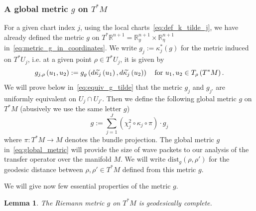 \documentclass[10pt]{amsart}
\newtheorem{lemm}[theo]{Lemma}\newtheorem{prop}[theo]{Proposition}\newtheorem{coro}[theo]{Corollary}\newtheorem{conj}[theo]{Conjecture}
\theoremstyle{definition}\newtheorem{defi}[theo]{Definition}\newtheorem{rema}[theo]{Remark}\newtheorem{exam}[theo]{Example}\newtheorem{exem}[theo]{Example}\newtheorem{nota}[theo]{Notation}
\newcommand{\dist}{\mathrm{dist}}
\newcommand{\bbR}{\mathbb{R}}
\let\oldtilde\tilde
\renewcommand*{\tilde}[1]{\mathchoice{\widetilde{#1}}{\widetilde{#1}}{\oldtilde{#1}}{\oldtilde{#1}}}
\begin{document}
\subsubsection{\label{subsec:A-metric}
A global metric \texorpdfstring{$g$}{g} on \texorpdfstring{$T^{*}M$}{T*M}}

For a given chart index $j$, using the local charts~\eqref{eq:def_k_tilde_j}, we have already defined the metric $g$ on $T^{*}\bbR^{n+1}=\bbR_{y}^{n+1}\times\bbR_{\eta}^{n+1}$ in~\eqref{eq:metric_g_in_coordinates}. We write $g_{j}:=\kappa_{j}^{*}(g)$ for the metric induced on $T^{*}U_{j}$, i.e. at a given point $\rho\in T^{*}U_{j}$, it is given by
\[
g_{j,\rho}\left(u_{1},u_{2}\right):=g_{\varrho}\left(d\tilde{\kappa_{j}}\left(u_{1}\right),d\tilde{\kappa_{j}}\left(u_{2}\right)\right)\quad\text{for }u_{1},u_{2}\in T_{\rho}\left(T^{*}M\right).
\]
We will prove below in~\eqref{eq:equiv_g_tilde} that the metric $g_{j}$ and $g_{j'}$ are uniformly equivalent on $U_{j}\cap U_{j'}$. Then we define the following global metric $g$ on $T^{*}M$ (abusively we use the same letter $g$)
\begin{equation}\label{eq:global_metric}
g:=\sum_{j=1}^{J}\left(\chi_{j}^{2}\circ\kappa_{j}\circ\pi\right)\cdot g_{j}
\end{equation}
where $\pi:T^{*}M\to M$ denotes the bundle projection. The global metric $g$ in~\eqref{eq:global_metric} will provide the size of wave packets to our analysis of the transfer operator over the manifold $M$. We will write $\dist_{g}(\rho,\rho')$ for the geodesic distance between $\rho,\rho'\in T^{*}M$ defined from this metric $g$.

We will give now few essential properties of the metric $g$.

\begin{cBoxB}{}
\begin{lemm}\label{thm:The-metric-}
The Riemann metric $g$ on $T^{*}M$ is \emph{geodesically complete}.
\end{lemm}
\end{cBoxB}
\end{document}
